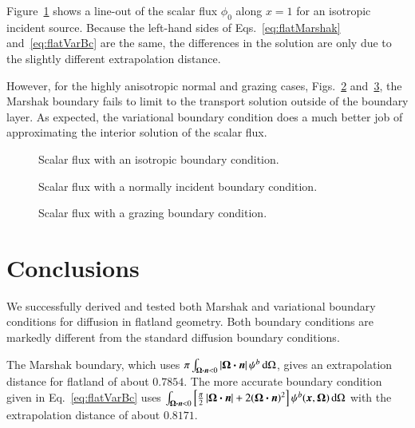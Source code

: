 \documentclass{anstrans}
\begin{document}
Figure~\ref{fig:isotropic} shows a line-out of the scalar flux $\phi_0$ along
$x=1$ for an isotropic incident source. Because the left-hand sides of
Eqs.~\eqref{eq:flatMarshak} and~\eqref{eq:flatVarBc} are the same, the
differences in the solution are only due to the slightly different
extrapolation distance.

However, for the highly anisotropic normal and grazing cases,
Figs.~\ref{fig:delta} and~\ref{fig:grazing}, the Marshak boundary fails to
limit to the transport solution outside of the boundary layer. As
expected, the variational boundary condition does a much better job of
approximating the interior solution of the scalar flux.

\begin{figure}[htb!]
  \centering
  \hspace{-.5in}
  
  \hspace{-.5in}
  \caption{Scalar flux with an isotropic boundary condition.}
  \label{fig:isotropic}
\end{figure}

\begin{figure}[htb!]
  \centering
  \hspace{-.5in}
  
  \hspace{-.5in}
  \caption{Scalar flux with a normally incident boundary condition.}
  \label{fig:delta}
\end{figure}

\begin{figure}[htb!]
  \centering
  \hspace{-.5in}
  
  \hspace{-.5in}
  \caption{Scalar flux with a grazing boundary condition.}
  \label{fig:grazing}
\end{figure}

\section{Conclusions}
We successfully derived and tested both Marshak and variational boundary
conditions for diffusion in flatland geometry. Both boundary conditions are
markedly different from the standard diffusion boundary conditions.

The Marshak boundary, which uses $\pi \int_{\bm{\Omega}\bm{\cdot} \bm{n} < 0 }
\left| \bm{\Omega}\bm{\cdot} \bm{n} \right| \psi^b \mathop{}\!\mathrm{d}\Omega$, gives an extrapolation
distance for flatland of about $0.7854$.
The more accurate boundary condition given in Eq.~\eqref{eq:flatVarBc} uses 
$\int_{\bm{\Omega}\bm{\cdot}\bm{n} < 0} \left[ \frac{\pi}{2}
\left| \bm{\Omega}\bm{\cdot}\bm{n} \right| + 2 (\bm{\Omega}\bm{\cdot}\bm{n})^2 \right]
\psi^b(\bm{x}, \bm{\Omega}) \mathop{}\!\mathrm{d}\Omega$ with the extrapolation distance of
about $0.8171$.
\end{document}
